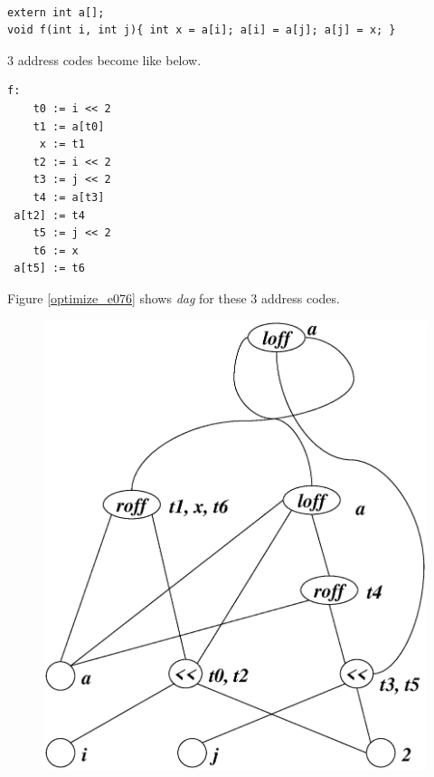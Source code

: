 \begin{Example}
\label{optimize_e075}
\begin{verbatim}

extern int a[];
void f(int i, int j){ int x = a[i]; a[i] = a[j]; a[j] =	x; }
\end{verbatim}
3 address codes become like below.
\begin{verbatim}
f:
    t0 := i << 2
    t1 := a[t0]
     x := t1
    t2 := i << 2
    t3 := j << 2
    t4 := a[t3]
 a[t2] := t4
    t5 := j << 2
    t6 := x
 a[t5] := t6
\end{verbatim}
Figure \ref{optimize_e076} shows {\em dag} for these 3 address codes.
\begin{figure}[htbp]
\begin{center}
\includegraphics[width=1.0\linewidth,height=1.4\linewidth]{opt031.eps}

\end{center}
\end{figure}
\end{Example}
